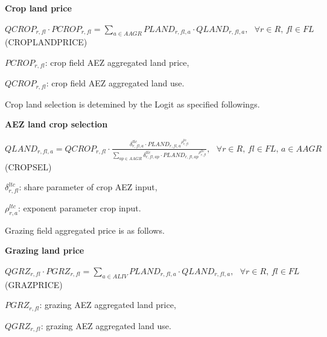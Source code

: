 \documentclass[10pt,a4paper,titlepage,dvipdfmx]{book}
\begin{document}
\begin{flushleft}\textbf{Crop land price}\end{flushleft}


\begin{center}$QCROP_{r,fl}\cdot PCROP_{r,fl}=\sum _{a\in AAGR}PLAND_{r,fl,a}\cdot QLAND_{r,fl,a},\,\,\,\,\forall r\in R,\,fl\in FL$ (CROPLANDPRICE)
\end{center}

\begin{flushleft}
$PCROP_{r,fl}$: crop field AEZ aggregated land price,

$QCROP_{r,fl}$: crop field AEZ aggregated land use.
\end{flushleft}

Crop land selection is detemined by the Logit as specified followings.

\begin{flushleft}\textbf{AEZ land crop selection}\end{flushleft}


\begin{center}$QLAND_{r,fl,a}=QCROP_{r,fl}\cdot \frac{\delta _{r,fl,a}^{ltc}\cdot PLAN{D_{r,fl,a}}^{\rho _{r,fl}^{ltc}}}{\sum _{ap\in AAGR}\delta _{r,fl,ap}^{ltc}\cdot PLAN{D_{r,fl,ap}}^{\rho _{r,fl}^{ltc}}},\,\,\,\,\forall r\in R,\,fl\in FL,\,a\in AAGR$ (CROPSEL)
\end{center}

\begin{flushleft}
$\delta _{r,fl}^{ltc}$: share parameter of crop AEZ input,

$\rho _{r,a}^{ltc}$: exponent parameter crop input.
\end{flushleft}

Grazing field aggregated price is as follows.

\begin{flushleft}\textbf{Grazing land price}\end{flushleft}


\begin{center}$QGRZ_{r,fl}\cdot PGRZ_{r,fl}=\sum _{a\in ALIV}PLAND_{r,fl,a}\cdot QLAND_{r,fl,a},\,\,\,\,\forall r\in R,\,fl\in FL$ (GRAZPRICE)
\end{center}

\begin{flushleft}
$PGRZ_{r,fl}$: grazing AEZ aggregated land price,

$QGRZ_{r,fl}$: grazing AEZ aggregated land use.
\end{flushleft}
\end{document}

